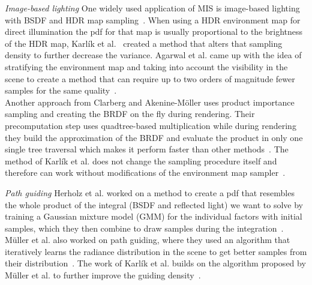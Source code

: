 \textit{Image-based lighting} One widely used application of MIS is image-based lighting with BSDF and HDR map sampling~\cite{pbr-book}.
When using a HDR environment map for direct illumination the pdf for that map is usually proportional to the brightness of the HDR map,
Karl\'ik et al.~\cite{Karlik2019} created a method that alters that sampling density to further decrease the variance.
Agarwal et al. came up with the idea of stratifying the environment map
and taking into account the visibility in the scene
to create a method that can require up to two orders of magnitude fewer samples for the same quality~\cite{agarwal}.\\
Another approach from Clarberg and Akenine-Möller uses product importance sampling
and creating the BRDF on the fly during rendering.
Their precomputation step uses quadtree-based multiplication while during rendering they build the approximation of the BRDF
and evaluate the product in only one single tree traversal which makes it perform faster than other methods~\cite{clarberg}.
The method of Karl\'ik et al. does not change the sampling procedure itself and therefore can work without modifications of the environment map sampler~\cite{Karlik2019}.

\textit{Path guiding} Herholz et al. worked on a method to create a pdf that resembles the whole product of the integral (BSDF and reflected light) we want to solve
by training a Gaussian mixture model (GMM) for the individual factors with initial samples,
which they then combine to draw samples during the integration~\cite{Herholz}.\\
M\"uller et al. also worked on path guiding,
where they used an algorithm that iteratively learns the radiance distribution in the scene to get better samples from their distribution~\cite{mueller2017}.
The work of Karl\'ik et al. builds on the algorithm proposed by M\"uller et al. to further improve the guiding density~\cite{Karlik2019}.